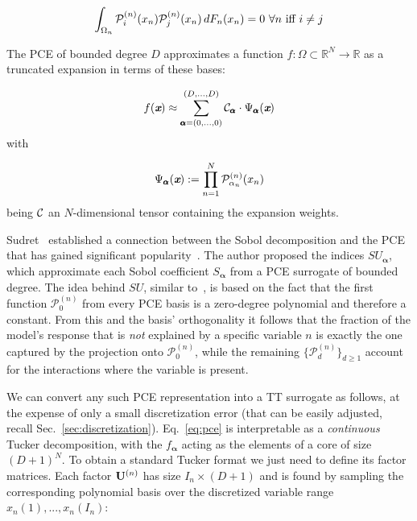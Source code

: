 \documentclass[review, twocolumn]{svjour3}          %
\begin{document}
\begin{equation}
\int_{\Omega_n} \mathcal{P}^{(n)}_i(x_n) \mathcal{P}^{(n)}_j(x_n) \, dF_n(x_n) = 0 \,\, \forall n \mbox{ iff } i \ne j
\end{equation}

The PCE of bounded degree $D$ approximates a function $f: \Omega \subset \mathbb{R}^N \to \mathbb{R}$ as a truncated expansion in terms of these bases:

\begin{equation}
\label{eq:pce}
f(\vec{x}) \approx \sum_{\pmb{\alpha} = (0, ..., 0)}^{(D, ..., D)} \set{C}_{\pmb{\alpha}} \cdot \Psi_{\pmb{\alpha}}(\vec{x})
\end{equation}
%
with

\begin{equation}
\Psi_{\pmb{\alpha}}(\vec{x}) := \prod_{n=1}^N \set{P}^{(n)}_{\alpha_n}(x_n)
\end{equation}
%
being $\mathcal{C}$ an $N$-dimensional tensor containing the expansion weights.

Sudret~\cite{Sudret:08} established a connection between the Sobol decomposition and the PCE that has gained significant popularity~\cite{GCAI:16, Bigoni:14, DKLM:14}. The author proposed the indices $SU_{\pmb{\alpha}}$, which approximate each Sobol coefficient $S_{\pmb{\alpha}}$ from a PCE surrogate of bounded degree. The idea behind $SU$, similar to~\cite{Sobol:69}, is based on the fact that the first function $\mathcal{P}^{(n)}_0$ from every PCE basis is a zero-degree polynomial and therefore a constant. From this and the basis' orthogonality it follows that the fraction of the model's response that is \emph{not} explained by a specific variable $n$ is exactly the one captured by the projection onto $\mathcal{P}^{(n)}_0$, while the remaining $\{\mathcal{P}^{(n)}_d\}_{d \ge 1}$ account for the interactions where the variable is present.

We can convert any such PCE representation into a TT surrogate as follows, at the expense of only a small discretization error (that can be easily adjusted, recall Sec.~\ref{sec:discretization}). Eq.~\ref{eq:pce} is interpretable as a \emph{continuous} Tucker decomposition, with the $f_{\pmb{\alpha}}$ acting as the elements of a core of size $(D+1)^N$. To obtain a standard Tucker format we just need to define its factor matrices. Each factor $\mathbf{U}^{(n)}$ has size $I_n \times (D+1)$ and is found by sampling the corresponding polynomial basis over the discretized variable range $x_n(1), ..., x_n(I_n)$:
\end{document}
